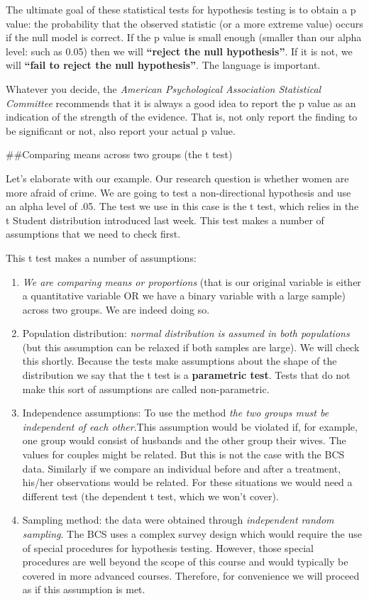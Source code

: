 \documentclass[]{book}
\theoremstyle{definition}
\theoremstyle{definition}
\theoremstyle{definition}
\theoremstyle{remark}
\begin{document}
The ultimate goal of these statistical tests for hypothesis testing is
to obtain a p value: the probability that the observed statistic (or a
more extreme value) occurs if the null model is correct. If the p value
is small enough (smaller than our alpha level: such as 0.05) then we
will \textbf{``reject the null hypothesis''}. If it is not, we will
\textbf{``fail to reject the null hypothesis''}. The language is
important.

Whatever you decide, the \emph{American Psychological Association
Statistical Committee} recommends that it is always a good idea to
report the p value as an indication of the strength of the evidence.
That is, not only report the finding to be significant or not, also
report your actual p value.

\#\#Comparing means across two groups (the t test)

Let's elaborate with our example. Our research question is whether women
are more afraid of crime. We are going to test a non-directional
hypothesis and use an alpha level of .05. The test we use in this case
is the t test, which relies in the t Student distribution introduced
last week. This test makes a number of assumptions that we need to check
first.

This t test makes a number of assumptions:

\begin{enumerate}
\def\labelenumi{\arabic{enumi}.}
\item
  \emph{We are comparing means or proportions} (that is our original
  variable is either a quantitative variable OR we have a binary
  variable with a large sample) across two groups. We are indeed doing
  so.
\item
  Population distribution: \emph{normal distribution is assumed in both
  populations} (but this assumption can be relaxed if both samples are
  large). We will check this shortly. Because the tests make assumptions
  about the shape of the distribution we say that the t test is a
  \textbf{parametric test}. Tests that do not make this sort of
  assumptions are called non-parametric.
\item
  Independence assumptions: To use the method \emph{the two groups must
  be independent of each other}.This assumption would be violated if,
  for example, one group would consist of husbands and the other group
  their wives. The values for couples might be related. But this is not
  the case with the BCS data. Similarly if we compare an individual
  before and after a treatment, his/her observations would be related.
  For these situations we would need a different test (the dependent t
  test, which we won't cover).
\item
  Sampling method: the data were obtained through \emph{independent
  random sampling}. The BCS uses a complex survey design which would
  require the use of special procedures for hypothesis testing. However,
  those special procedures are well beyond the scope of this course and
  would typically be covered in more advanced courses. Therefore, for
  convenience we will proceed as if this assumption is met.
\end{enumerate}
\end{document}
